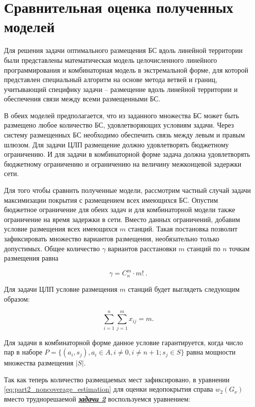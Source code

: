 \section{Сравнительная оценка полученных моделей}
Для решения задачи оптимального размещения БС вдоль линейной территории были представлены математическая модель целочисленного линейного программирования и комбинаторная модель в экстремальной форме, для которой представлен специальный алгоритм на основе метода ветвей и границ, учитывающий специфику задачи -- размещение вдоль линейной территории и обеспечения связи между всеми размещенными БС.

В обеих моделей предполагается, что из заданного множества БС может быть размещено любое количество БС, удовлетворяющих условиям задачи. Через систему размещенных БС необходимо обеспечить связь между левым и правым шлюзом. Для задачи ЦЛП размещение должно удовлетворять бюджетному ограничению. И для задачи в комбинаторной форме задача должна удовлетворять бюджетному ограничению и ограничению на величину межконцевой задержки сети.

Для того чтобы сравнить полученные модели, рассмотрим частный случай задачи максимизации покрытия с размещением всех имеющихся БС. Опустим бюджетное ограничение для обеих задач и для комбинаторной модели также ограничение на время задержки в сети. Вместо данных ограничений, добавим условие размещения всех имеющихся $m$ станций. Такая постановка позволит зафиксировать множество вариантов размещения, необязательно только допустимых. Общее количество $\gamma$ вариантов расстановки $m$ станций по $n$ точкам размещения равна 

\begin{equation}
  \label{eq:part2_gamma}
  \gamma = C^m_n \cdot m! \ .
\end{equation}

Для задачи ЦЛП условие размещения $m$ станций будет выглядеть следующим образом:


\begin{equation}
  \label{eq:part3_placed_all_station}
  \sum\limits_{i=1}^n \sum\limits_{j=1}^m x_{ij} = m.
\end{equation}

Для задачи в комбинаторной форме данное условие гарантируется, когда число пар в наборе $P = \{ (a_i, s_j), a_i \in A, i \neq 0, i \neq n + 1; s_j \in S\}$ равна мощности множества размещения $|S|$. 

Так как теперь количество размещаемых мест зафиксировано, в уравнении \cref{eq:part2_noncoverage_estimation} для оценки недопокрытия справа $w_2 \left(G_\nu \right)$ вместо труднорешаемой \underline{\textit{\textbf{задачи 2}}} воспользуемся уравнением:


